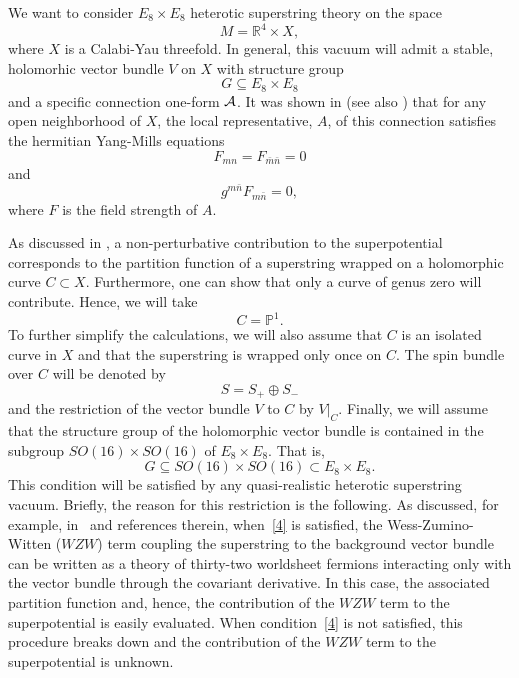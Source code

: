 \documentclass[a4paper,12pt]{article}
\numberwithin{equation}{section}
\theoremstyle{plain}
\begin{document}

We want to consider $E_8 \times E_8$ heterotic superstring theory on the
space
%
\begin{equation}
M={\mathbb R}^4 \times X,
\label{1}
\end{equation}
%
where $X$ is a Calabi-Yau threefold. In general, this vacuum will admit a
stable, holomorhic vector bundle $V$ on $X$ with structure group
%
\begin{equation}
G \subseteq E_8 \times E_8
\label{2}
\end{equation}
%
and a specific connection one-form ${\cal{A}}$. It was shown in
\cite{CHSW} (see also \cite{GSW}) that for any open neighborhood of $X$,
the
local representative, $A$, of this connection satisfies the hermitian
Yang-Mills equations
%
\begin{equation}
F_{mn} = F_{\bar m \bar n} =0
\label{check}
\end{equation}
%
and
%
\begin{equation}
g^{m \bar n}F_{m \bar n} =0,
\label{3}
\end{equation}
%
where $F$ is the field strength of $A$.

As discussed in \cite{BBS}, a non-perturbative contribution to the
superpotential corresponds to the partition function of a superstring
wrapped
on a holomorphic curve $C \subset X$. Furthermore, one can show
\cite{Witten1} that only a curve of genus zero will contribute.
Hence, we will take
%
\begin{equation}
C={\mathbb P}^1.
\label{4.5}
\end{equation}
%
To further simplify the calculations, we will also assume that $C$
is an isolated curve in $X$ and that the superstring is wrapped only once
on $C$. The spin bundle over $C$ will be denoted by
%
\begin{equation}
S = S_{+} \oplus S_{-}
\label{5}
\end{equation}
%
and the restriction of the vector bundle $V$ to $C$ by $V|_{C}$.
Finally, we will assume that the structure group of the
holomorphic vector bundle is contained in the
subgroup $SO(16) \times SO(16)$
of $E_8 \times E_8$. That is,
%
\begin{equation}
G \subseteq SO(16) \times SO(16) \subset E_8 \times E_8.
\label{4}
\end{equation}
%
This condition will be satisfied by any quasi-realistic heterotic
superstring vacuum. Briefly, the reason for this restriction is the
following. As discussed, for example, in~\cite{Witten1,Lima1} and
references
therein, when~\eqref{4} is
satisfied, the Wess-Zumino-Witten ($WZW$) term coupling the superstring to
the
background vector bundle can be written as a theory of thirty-two
worldsheet
fermions interacting only with the vector bundle through the
covariant derivative. In this case, the associated partition function and,
hence, the contribution of the $WZW$ term to the superpotential is easily
evaluated. When condition~\eqref{4} is not satisfied, this procedure
breaks
down and the contribution of the $WZW$ term to the superpotential is
unknown.
\end{document}
